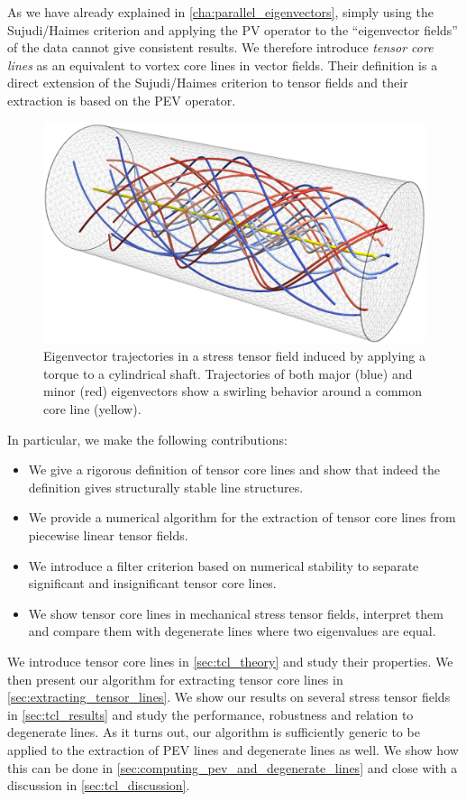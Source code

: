 %
As we have already explained in \cref{cha:parallel_eigenvectors}, simply using
the Sujudi/Haimes criterion and applying the \ac{PV} operator to the
``eigenvector fields'' of the data cannot give consistent results.
%
We therefore introduce \emph{tensor core lines} as an equivalent to vortex
core lines in vector fields.
%
Their definition is a direct extension of the Sujudi/Haimes criterion to tensor
fields and their extraction is based on the \ac{PEV} operator.
%
\begin{figure}[t]
    \centering
    \includegraphics[width=\columnwidth]{figures/torque_tube_lines.png}
    \caption{Eigenvector trajectories in a stress tensor field induced by
             applying a torque to a cylindrical shaft. Trajectories of both
             major (blue) and minor (red) eigenvectors show a swirling behavior
             around a common core line (yellow).
             }
    \label{fig:tube_lines}
\end{figure}
%
In particular, we make the following contributions:
%
\begin{itemize}
    \item  We give a rigorous definition of tensor core lines and show that
    indeed the definition gives structurally stable line structures.
    \item We provide a numerical algorithm for the extraction of tensor core
    lines from piecewise linear tensor fields.
    \item We introduce a filter criterion based on numerical stability to
    separate significant and insignificant tensor core lines.
    \item We show tensor core lines in mechanical stress tensor fields,
    interpret them and compare them with degenerate lines where two eigenvalues
    are equal.
\end{itemize}
%
We introduce tensor core lines in \cref{sec:tcl_theory} and study their
properties.
%
We then present our algorithm for extracting tensor core lines in
\cref{sec:extracting_tensor_lines}.
%
We show our results on several stress tensor fields in \cref{sec:tcl_results}
and study the performance, robustness and relation to degenerate lines.
%
As it turns out, our algorithm is sufficiently generic to be applied to the
extraction of \ac{PEV} lines and degenerate lines as well.
%
We show how this can be done in \cref{sec:computing_pev_and_degenerate_lines}
and close with a discussion in \cref{sec:tcl_discussion}.
%
